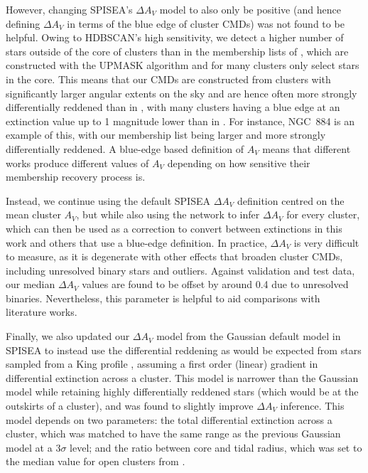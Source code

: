 However, changing SPISEA's $\Delta A_V$ model to also only be positive (and hence defining $\Delta A_V$ in terms of the blue edge of cluster CMDs) was not found to be helpful. Owing to HDBSCAN's high sensitivity, we detect a higher number of stars outside of the core of clusters than in the membership lists of \cite{cantat-gaudin_clusters_2020}, which are constructed with the UPMASK algorithm \citep{krone-martins_upmask:_2014} and for many clusters only select stars in the core. This means that our CMDs are constructed from clusters with significantly larger angular extents on the sky and are hence often more strongly differentially reddened than in \cite{cantat-gaudin_clusters_2020}, with many clusters having a blue edge at an extinction value up to 1 magnitude lower than in \cite{cantat-gaudin_clusters_2020}. For instance, NGC~884 is an example of this, with our membership list being larger and more strongly differentially reddened. A blue-edge based definition of $A_V$ means that different works produce different values of $A_V$ depending on how sensitive their membership recovery process is.

Instead, we continue using the default SPISEA $\Delta A_V$ definition centred on the mean cluster $A_V$, but while also using the network to infer $\Delta A_V$ for every cluster, which can then be used as a correction to convert between extinctions in this work and others that use a blue-edge definition. In practice, $\Delta A_V$ is very difficult to measure, as it is degenerate with other effects that broaden cluster CMDs, including unresolved binary stars and outliers. Against validation and test data, our median $\Delta A_V$ values are found to be offset by around 0.4 due to unresolved binaries. Nevertheless, this parameter is helpful to aid comparisons with literature works.

Finally, we also updated our $\Delta A_V$ model from the Gaussian default model in SPISEA to instead use the differential reddening as would be expected from stars sampled from a King profile \citep{king_structure_1962}, assuming a first order (linear) gradient in differential extinction across a cluster. This model is narrower than the Gaussian model while retaining highly differentially reddened stars (which would be at the outskirts of a cluster), and was found to slightly improve $\Delta A_V$ inference. This model depends on two parameters: the total differential extinction across a cluster, which was matched to have the same range as the previous Gaussian model at a $3\sigma$ level; and the ratio between core and tidal radius, which was set to the median value for open clusters from \cite{kharchenko_global_2013}.

